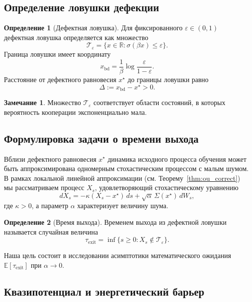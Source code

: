 \documentclass[12pt,a4paper]{article}
\theoremstyle{definition}
\newtheorem{definition}{Определение}
\newtheorem{remark}{Замечание}
\begin{document}
\subsection{Определение ловушки дефекции}

\begin{definition}[Дефектная ловушка]
\label{def:trap}
Для фиксированного $\varepsilon \in (0,1)$
дефектная ловушка определяется как множество
\[
\mathcal{T}_\varepsilon
=
\{ x \in \mathbb{R} : \sigma(\beta x) \le \varepsilon \}.
\]
Граница ловушки имеет координату
\[
x_{\mathrm{bd}}
=
\frac{1}{\beta}
\log\frac{\varepsilon}{1-\varepsilon}.
\]
Расстояние от дефектного равновесия $x^\star$
до границы ловушки равно
\[
\Delta := x_{\mathrm{bd}} - x^\star > 0.
\]
\end{definition}

\begin{remark}
Множество $\mathcal{T}_\varepsilon$
соответствует области состояний,
в которых вероятность кооперации
экспоненциально мала.
\end{remark}

\subsection{Формулировка задачи о времени выхода}

Вблизи дефектного равновесия $x^\star$
динамика исходного процесса обучения
может быть аппроксимирована
одномерным стохастическим процессом
с малым шумом.
В рамках локальной линейной аппроксимации
(см. Теорему~\ref{thm:ou_correct})
мы рассматриваем процесс $X_s$,
удовлетворяющий стохастическому уравнению
\[
dX_s
=
-\kappa (X_s - x^\star)\,ds
+
\sqrt{\alpha}\,\Sigma(x^\star)\,dW_s,
\]
где $\kappa>0$,
а параметр $\alpha$ характеризует величину шума.

\begin{definition}[Время выхода]
\label{def:exit_time}
Временем выхода из дефектной ловушки
называется случайная величина
\[
\tau_{\mathrm{exit}}
=
\inf\{ s \ge 0 : X_s \notin \mathcal{T}_\varepsilon \}.
\]
\end{definition}

Наша цель состоит в исследовании асимптотики
математического ожидания
$\mathbb{E}[\tau_{\mathrm{exit}}]$
при $\alpha \to 0$.


\subsection{Квазипотенциал и энергетический барьер}
\end{document}

